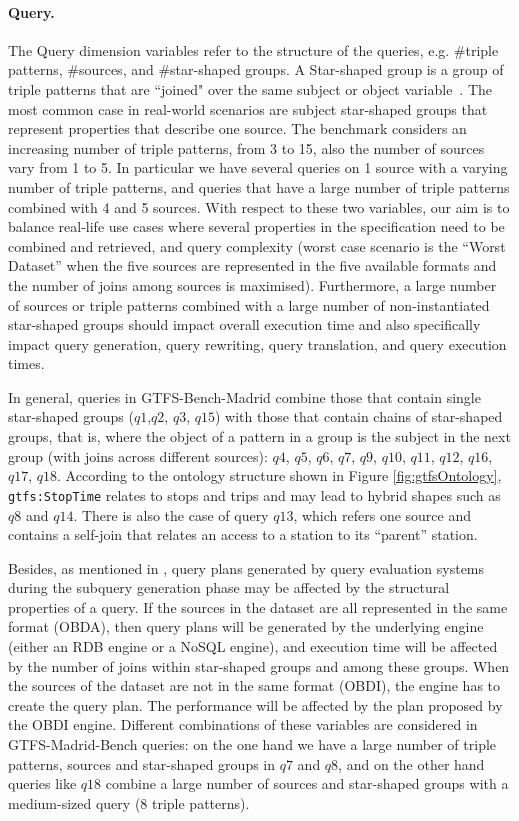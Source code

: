 \noindent\paragraph{\textbf{Query.}} The Query dimension variables refer to the structure of the queries, e.g. \#triple patterns, \#sources, and  \#star-shaped groups. A  Star-shaped group is a group of triple patterns that are ``joined" over the same subject or object variable~\citep{vidal2010efficient}. The most common case in real-world scenarios are subject star-shaped groups that represent properties that describe one source. The benchmark considers an increasing number of triple patterns, from 3 to 15, also the number of sources vary from 1 to 5. In particular we have several queries on 1 source with a varying number of triple patterns, and queries that have a large number of triple patterns combined with 4 and 5 sources. %
With respect to these two variables, our aim is to balance real-life use cases where several properties in the specification need to be combined and retrieved, and query complexity (worst case scenario is the ``Worst Dataset'' when the five sources are represented in the five available formats and the number of joins among sources is maximised).
Furthermore, a large number of sources or triple patterns  combined with a large number of non-instantiated star-shaped groups should impact overall execution time and also specifically impact query generation, query rewriting, query translation, and query execution times. 

In general, queries in GTFS-Bench-Madrid combine those that contain single star-shaped groups ($q1$,$q2$, $q3$, $q15$) with those that contain chains of star-shaped groups, that is, where the object of a pattern in a group is the subject in the next group (with joins across different sources): $q4$, $q5$, $q6$, $q7$, $q9$, $q10$, $q11$, $q12$, $q16$, $q17$, $q18$. 
According to the ontology structure shown in Figure \ref{fig:gtfsOntology}, \texttt{gtfs:StopTime} relates to stops and trips and may lead to hybrid shapes such as $q8$ and $q14$. There is also the case of query $q13$, which refers one source and contains a self-join that relates an access to a station to its ``parent'' station.

Besides, as mentioned in \citep{montoya2012benchmarking}, query plans generated by query evaluation systems during the subquery generation pha\-se may be affected by the structural properties of a query. If the sources in the dataset are all represented in the same format (OBDA), then query plans will be generated by the underlying engine (either an RDB engine or a NoSQL engine), and execution time will be affected by the number of joins within star-shaped groups and among these groups. When the sources of the dataset are not in the same format (OBDI), the engine has to create the query plan. The performance will be affected by the plan proposed by the OBDI engine. Different combinations of these variables are considered in GTFS-Madrid-Bench queries: on the one hand we have a large number of triple patterns, sources and star-shaped groups in $q7$ and $q8$, and on the other hand queries like $q18$ combine a large number of sources and star-shaped groups with a medium-sized query (8 triple patterns).

